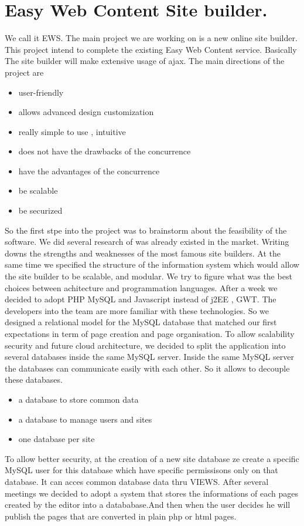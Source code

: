 \section{Easy Web Content Site builder.}

We call it EWS. The main project we are working on is a new online site builder. This project intend to complete the existing Easy Web Content service.
Basically The site builder will make extensive usage of ajax. The main directions of the project are
\begin{itemize}
\item user-friendly
\item allows advanced design customization
\item really simple to use , intuitive
\item does not have the drawbacks of the concurrence
\item have the advantages of the concurrence
\item be scalable
\item be securized
\end{itemize}


So the first stpe into the project was to brainstorm about the feasibility of the software. We did several research of was already existed in the market. Writing downs the strengths and weaknesses of the most famous site builders. At the same time we specified the structure of the information system which would allow the site builder to be scalable, and modular. We try to figure what was the best choices between achitecture and programmation languages. After a week we decided to adopt PHP MySQL and Javascript instead of j2EE , GWT. The developers into the team are more familiar with these technologies. So we designed a relational model for the MySQL database that matched our first expectations in term of page creation and page organisation.
To allow scalability security and future cloud architecture, we decided to split the application into several databases inside the same MySQL server. Inside the same MySQL server the databases can communicate easily with each other. So it allows to decouple these databases.
\begin{itemize}
\item a database to store common data
\item a database to manage users and sites
\item one database per site 
\end{itemize}
To allow better security, at the creation of a new site database ze create a specific MySQL user for this database which have specific permissisons only on that database. It can acces common database data thru VIEWS.
After several meetings we decided to adopt a system that stores the informations of each pages created by the editor into a datababase.And then when the user decides he will publish the pages that are converted in plain php or html pages.

